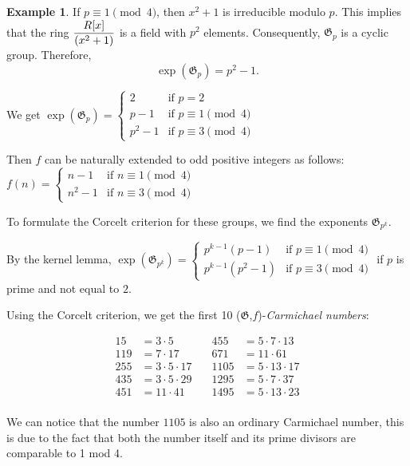 \documentclass{article}
\theoremstyle{definition}
\newtheorem{example}{Example}
\theoremstyle{definition}
\begin{document}
\begin{example}
    If \( p \equiv 1 \pmod{4} \), then \( x^2 + 1 \) is irreducible modulo \( p \). This implies that the ring 
    $ \Large\dfrac{R[x]}{ (x^2+1)}$  is a field with \( p^2 \) elements. Consequently, \( \mathfrak{G}_p \) 
    is a cyclic group. Therefore,
    \[
    \operatorname{exp}(\mathfrak{G}_p) = p^2 - 1.
    \]
    
    We get $\operatorname{exp}(\mathfrak{G}_p) = \begin{cases} 
        2 & \text{if } p = 2 \\
        p - 1 & \text{if } p \equiv 1 \pmod{4} \\
        p^2 - 1 & \text{if } p \equiv 3 \pmod{4}
    \end{cases}$
    
    Then $f$ can be naturally extended to odd positive integers as follows: $f(n) = 
    \begin{cases}
        n - 1 & \text{if } n \equiv 1 \pmod{4}\\
        n^2 - 1 & \text{if } n \equiv 3 \pmod{4}
    \end{cases}
    $
    
    To formulate the Corcelt criterion for these groups, we find the exponents $\mathfrak{G}_{p^k}$.
    
    By the kernel lemma, $\operatorname{exp}(\mathfrak{G}_{p^k}) = \begin{cases} 
        p^{k-1}(p - 1) & \text{if } p \equiv 1 \pmod{4} \\
        p^{k-1}(p^2 - 1) & \text{if } p \equiv 3 \pmod{4}
    \end{cases}$ if $p$ is prime and not equal to $2$.
    
    Using the Corcelt criterion, we get the first 10 ($\mathfrak{G}$,$f$)-\textit{Carmichael numbers}:
    
    $$\begin{aligned}
        15   &= 3 \cdot 5 \quad     &455  &= 5 \cdot 7 \cdot 13 \\
        119  &= 7 \cdot 17 \quad    &671  &= 11 \cdot 61 \\
        255  &= 3 \cdot 5 \cdot 17 \quad &1105 &= 5 \cdot 13 \cdot 17 \\
        435  &= 3 \cdot 5 \cdot 29 \quad &1295 &= 5 \cdot 7 \cdot 37 \\
        451  &= 11 \cdot 41 \quad   &1495 &= 5 \cdot 13 \cdot 23 \\        
        \end{aligned}$$
    
    We can notice that the number $1105$ is also an ordinary Carmichael number, this is due to the fact that both 
    the number itself and its prime divisors are comparable to 1 mod 4. 

\end{example}
\end{document}
